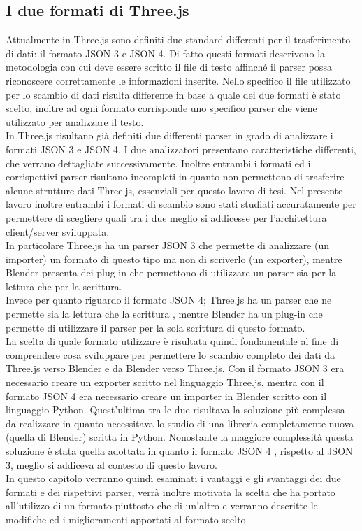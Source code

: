 \subsection{I due formati di Three.js}
Attualmente in Three.js sono definiti due standard differenti per il trasferimento di dati: il formato JSON 3 e JSON 4. Di fatto questi formati descrivono la metodologia con cui deve essere scritto il file di testo affinché il parser possa riconoscere correttamente le informazioni inserite.
Nello specifico il file utilizzato per lo scambio di dati risulta differente in base a quale dei due formati è stato scelto, inoltre ad ogni formato corrisponde uno specifico parser che viene utilizzato per analizzare il testo.
\\
In Three.js risultano già definiti due differenti parser in grado di analizzare i formati JSON 3 e JSON 4. I due analizzatori presentano caratteristiche differenti, che verrano dettagliate successivamente. Inoltre entrambi i formati ed i corrispettivi parser risultano incompleti in quanto non permettono di trasferire alcune strutture dati Three.js, essenziali per questo lavoro di tesi.
Nel presente lavoro inoltre entrambi i formati di scambio sono stati studiati accuratamente per permettere di scegliere quali tra i due meglio si addicesse per l’architettura client/server sviluppata.
\\
In particolare Three.js ha un parser JSON 3 che permette di analizzare (un importer) un formato di questo tipo ma non di scriverlo (un exporter), mentre Blender presenta dei plug-in che permettono di utilizzare un parser sia per la lettura che per la scrittura.
\\
Invece per quanto riguardo il formato JSON 4; Three.js ha un parser che ne permette sia la lettura che la scrittura , mentre Blender ha un plug-in che permette di utilizzare il parser per la sola scrittura di questo formato.
\\
La scelta di quale formato utilizzare è risultata quindi fondamentale al fine di comprendere cosa sviluppare per permettere lo scambio completo dei dati da Three.js verso Blender e da Blender verso Three.js.
Con il formato JSON 3 era necessario creare un exporter scritto nel linguaggio Three.js, mentra con il formato JSON 4 era necessario creare un importer in Blender scritto con il linguaggio Python.
Quest’ultima  tra le due risultava la soluzione più complessa da realizzare in quanto necessitava lo studio di una libreria completamente nuova (quella di Blender) scritta in Python.
Nonostante la maggiore complessità questa soluzione è stata quella adottata in quanto il formato JSON 4 , rispetto al JSON 3, meglio si addiceva al contesto di questo lavoro.
\\
In questo capitolo verranno quindi esaminati i vantaggi e gli svantaggi dei due formati e dei rispettivi parser, verrà inoltre motivata la scelta che ha portato all’utilizzo di un formato piuttosto che di un’altro e verranno descritte le modifiche ed i miglioramenti apportati al formato scelto.


